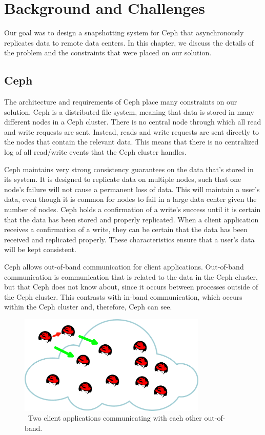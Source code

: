 \chapter{Background and Challenges}
\label{sec:description}

Our goal was to design a snapshotting system for Ceph that
asynchronously replicates data to remote data centers. In this
chapter, we discuss the details of the problem and the constraints
that were placed on our solution.

\section{Ceph}

The architecture and requirements of Ceph place many constraints on
our solution. Ceph is a distributed file system, meaning that data is
stored in many different nodes in a Ceph cluster. There is no central
node through which all read and write requests are sent.  Instead,
reads and write requests are sent directly to the nodes that contain
the relevant data. This means that there is no centralized log of all
read/write events that the Ceph cluster handles.

Ceph maintains very strong consistency guarantees on the data that's
stored in its system. It is designed to replicate data on multiple
nodes, such that one node's failure will not cause a permanent loss of
data. This will maintain a user's data, even though it is common for
nodes to fail in a large data center given the number of
nodes. Ceph holds a confirmation of a write's success until
it is certain that the data has been stored and properly
replicated. When a client application receives a confirmation of a write, they can
be certain that the data has been received and replicated
properly. These characteristics ensure that a user's data will be kept
consistent.

Ceph allows out-of-band communication for client applications.
Out-of-band communication is communication that is related to the data
in the Ceph cluster, but that Ceph does not know about, since it occurs between processes outside of the Ceph cluster. This contrasts with
in-band communication, which occurs within the Ceph cluster and, therefore, Ceph can see.

\begin{figure}[!htbp]
  \centering
  \caption{~Two client applications communicating with each other out-of-band.} 
  \label{fig:out-of-band}
  \includegraphics[width=0.8\textwidth]{outofbandwrite.png}
\end{figure}

